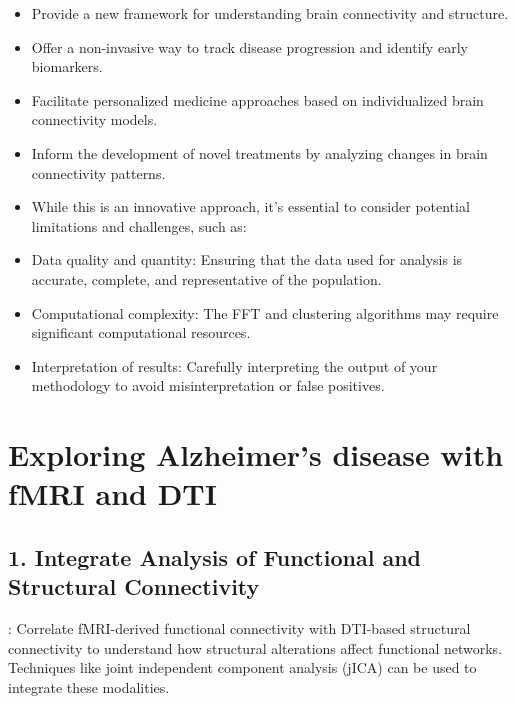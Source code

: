 \documentclass[twocolumn]{article}
\begin{document}
\begin{itemize}
\item Provide a new framework for understanding brain connectivity and structure.

\item Offer a non-invasive way to track disease progression and identify early biomarkers.

\item Facilitate personalized medicine approaches based on individualized brain connectivity models.

\item Inform the development of novel treatments by analyzing changes in brain connectivity patterns.


\item While this is an innovative approach, it's essential to consider potential limitations and challenges, such as:


\item Data quality and quantity: Ensuring that the data used for analysis is accurate, complete, and representative of the population.

\item Computational complexity: The FFT and clustering algorithms may require significant computational resources.

\item Interpretation of results: Carefully interpreting the output of your methodology to avoid misinterpretation or false positives.
\end{itemize}


\section{Exploring Alzheimer's disease with fMRI and DTI}


\subsection*{1. Integrate Analysis of Functional and Structural Connectivity}

: Correlate fMRI-derived functional connectivity with DTI-based structural connectivity to understand how
structural alterations affect functional networks. Techniques like joint independent component analysis (jICA) can be used to integrate these modalities.
\end{document}
